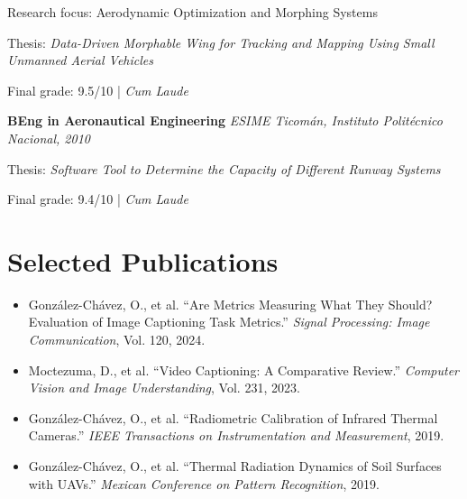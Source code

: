 \documentclass[10pt]{article}
\begin{document}
Research focus: Aerodynamic Optimization and Morphing Systems

Thesis: \textit{Data-Driven Morphable Wing for Tracking and Mapping
Using Small Unmanned Aerial Vehicles}

Final grade: 9.5/10
\enspace|\enspace
\textit{Cum Laude}

\vspace{4pt}

\textbf{BEng in Aeronautical Engineering}
\hfill
\textit{ESIME Ticom\'an, Instituto Polit\'ecnico Nacional, 2010}

Thesis: \textit{Software Tool to Determine the Capacity of Different
Runway Systems}

Final grade: 9.4/10
\enspace|\enspace
\textit{Cum Laude}


\section*{Selected Publications}

\begin{itemize}
    \item Gonz\'alez-Ch\'avez, O., et al.
    ``Are Metrics Measuring What They Should? Evaluation of Image
    Captioning Task Metrics.''
    \textit{Signal Processing: Image Communication}, Vol. 120, 2024.

    \item Moctezuma, D., et al.
    ``Video Captioning: A Comparative Review.''
    \textit{Computer Vision and Image Understanding}, Vol. 231, 2023.

    \item Gonz\'alez-Ch\'avez, O., et al.
    ``Radiometric Calibration of Infrared Thermal Cameras.''
    \textit{IEEE Transactions on Instrumentation and Measurement}, 2019.

    \item Gonz\'alez-Ch\'avez, O., et al.
    ``Thermal Radiation Dynamics of Soil Surfaces with UAVs.''
    \textit{Mexican Conference on Pattern Recognition}, 2019.
\end{itemize}
\end{document}
